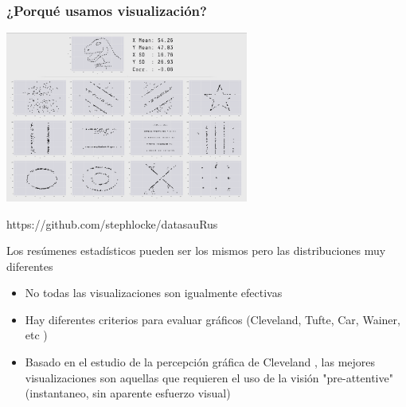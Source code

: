 \documentclass[9pt, spanish]{beamer}\usepackage[]{graphicx}\usepackage[]{color}
\begin{document}


% 
% 
% 
\begin{frame}
\frametitle{¿Porqu\'e usamos visualizaci\'on?}

\begin{center}
\includegraphics[width=8cm]{dino}
\end{center}
https://github.com/stephlocke/datasauRus

Los res\'umenes estad\'isticos pueden ser los mismos pero las distribuciones muy diferentes
\end{frame}


\begin{frame}
\begin{itemize}
\frametitle{Visualizaciones efectivas?}
\item No todas las visualizaciones son igualmente efectivas
\item Hay diferentes criterios para evaluar gr\'aficos (Cleveland, Tufte, Car, Wainer, etc  )
\item Basado en el estudio de la percepci\'on gr\'afica de Cleveland \citep{cleveland},
las mejores visualizaciones son aquellas que requieren el uso de la visi\'on "pre-attentive" (instantaneo, sin aparente esfuerzo visual)

\end{itemize}
\end{frame}
\end{document}
